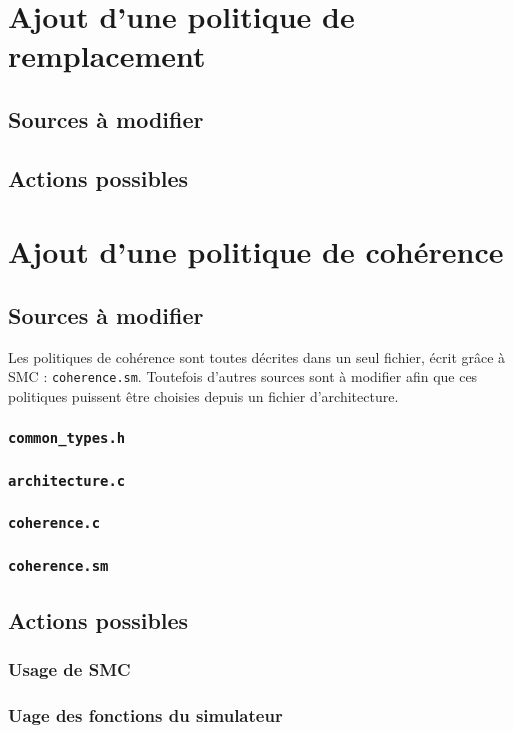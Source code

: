 \section{Ajout d'une politique de remplacement}

\subsection{Sources à modifier}

\subsection{Actions possibles}

\section{Ajout d'une politique de cohérence}
\label{tuto_aut}

\subsection{Sources à modifier}

Les politiques de cohérence sont toutes décrites dans un seul fichier, écrit grâce à \textsf{SMC} : \texttt{coherence.sm}. Toutefois d'autres sources sont à modifier afin que ces politiques puissent être choisies depuis un fichier d'architecture.

\subsubsection{\texttt{common\_types.h}}

\subsubsection{\texttt{architecture.c}}

\subsubsection{\texttt{coherence.c}}

\subsubsection{\texttt{coherence.sm}}

\subsection{Actions possibles}

\subsubsection{Usage de \textsf{SMC}}

\subsubsection{Uage des fonctions du simulateur}

